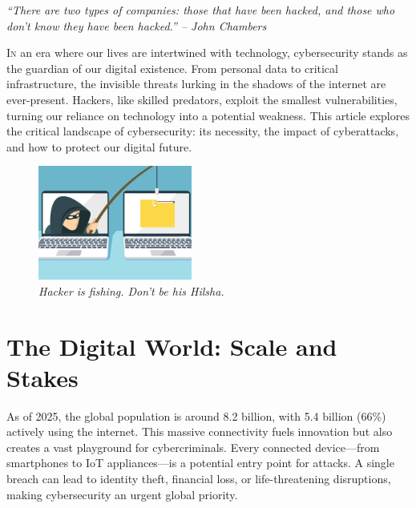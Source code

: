 \usepackage{framed}
\newenvironment{magquote}
  {\begin{shaded*}\itshape\small}
  {\end{shaded*}}



  

\begin{magquote}
 ``There are two types of companies: those that have been hacked, and those who don’t know they have been hacked.'' -- John Chambers   
\end{magquote}



\lettrine[lines=2]{I}{n} an era where our lives are intertwined with technology, cybersecurity stands as the guardian of our digital existence. From personal data to critical infrastructure, the invisible threats lurking in the shadows of the internet are ever-present. Hackers, like skilled predators, exploit the smallest vulnerabilities, turning our reliance on technology into a potential weakness. This article explores the critical landscape of cybersecurity: its necessity, the impact of cyberattacks, and how to protect our digital future.

\begin{figure}[h]
  \centering
  \includegraphics[width=0.45\textwidth]{phishing.png}
  \caption{\textit{Hacker is fishing. Don't be his Hilsha.}}
\end{figure}

\section*{The Digital World: Scale and Stakes}
As of 2025, the global population is around 8.2 billion, with 5.4 billion (66\%) actively using the internet. This massive connectivity fuels innovation but also creates a vast playground for cybercriminals. Every connected device—from smartphones to IoT appliances—is a potential entry point for attacks. A single breach can lead to identity theft, financial loss, or life-threatening disruptions, making cybersecurity an urgent global priority.

